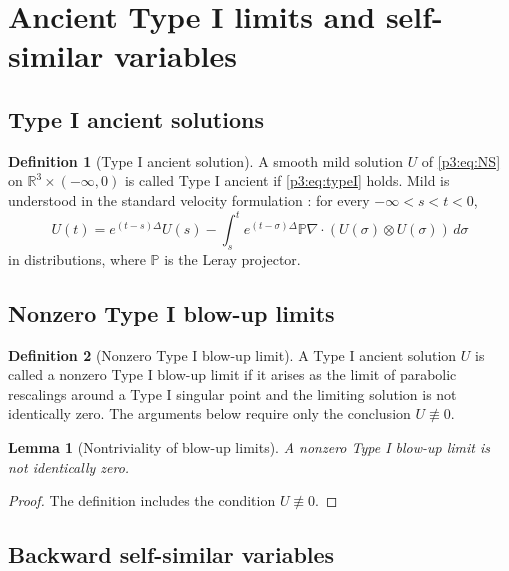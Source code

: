 \documentclass[11pt]{amsart}
\theoremstyle{plain}
\newtheorem{lemma}[lemma]{Lemma}
\theoremstyle{definition}
\newtheorem{definition}[definition]{Definition}
\theoremstyle{remark}
\numberwithin{equation}{section}
\begin{document}
\section{Ancient Type I limits and self-similar variables}
\label{p3:sec:typeI}

\subsection{Type I ancient solutions}

\begin{definition}[Type I ancient solution]
\label{p3:def:typeI-ancient}
A smooth mild solution \(U\) of \eqref{p3:eq:NS} on
\(\mathbb R^3\times(-\infty,0)\) is called Type I ancient if
\eqref{p3:eq:typeI} holds.  Mild is understood in the standard velocity
formulation \cite{Kato1984,Sohr2001}: for every \(-\infty<s<t<0\),
\begin{equation}\label{p3:eq:mild-formula}
   U(t)=e^{(t-s)\Delta}U(s)
   -\int_s^t e^{(t-\sigma)\Delta}\mathbb P\nabla\cdot
      (U(\sigma)\otimes U(\sigma))\,d\sigma
\end{equation}
in distributions, where \(\mathbb P\) is the Leray projector.
\end{definition}

\subsection{Nonzero Type I blow-up limits}

\begin{definition}[Nonzero Type I blow-up limit]
\label{p3:def:nonzero-typeI-limit}
A Type I ancient solution \(U\) is called a nonzero Type I blow-up limit if it
arises as the limit of parabolic rescalings around a Type I singular point and
the limiting solution is not identically zero.  The arguments below require
only the conclusion \(U\not\equiv0\).
\end{definition}

\begin{lemma}[Nontriviality of blow-up limits]
\label{p3:lem:nonzero-typeI-limit}
   A nonzero Type I blow-up limit is not identically zero.
\end{lemma}

\begin{proof}
The definition includes the condition \(U\not\equiv0\).
\end{proof}

\subsection{Backward self-similar variables}
\end{document}
